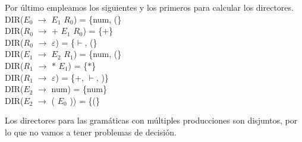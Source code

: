 \documentclass[\main/ApuntesPL.tex]{subfiles}
\begin{document}
      \par
      Por último empleamos los siguientes y los primeros para calcular los directores.
      \hspace{5mm}DIR($E_0$ $\rightarrow$ $E_1$ $R_0$) = \{num, (\}\\
      \hspace{5mm}DIR($R_0$ $\rightarrow$ + $E_1$ $R_0$) = \{+\}\\
      \hspace{5mm}DIR($R_0$ $\rightarrow$ $\varepsilon$) = \{$\vdash$, (\}\\
      \hspace{5mm}DIR($E_1$ $\rightarrow$ $E_2$ $R_1$) = \{num, (\}\\
      \hspace{5mm}DIR($R_1$ $\rightarrow$ $\ast$ $E_1$) = \{$\ast$\}\\
      \hspace{5mm}DIR($R_1$ $\rightarrow$ $\varepsilon$) = \{+, $\vdash$, )\}\\
      \hspace{5mm}DIR($E_2$ $\rightarrow$ num) = \{num\}\\
      \hspace{5mm}DIR($E_2$ $\rightarrow$ ( $E_0$ )) = \{(\}\\

      \bigskip
      \par
      Los directores para las gramáticas con múltiples producciones son disjuntos, por lo que
      no vamos a tener problemas de decisión.
\end{document}
